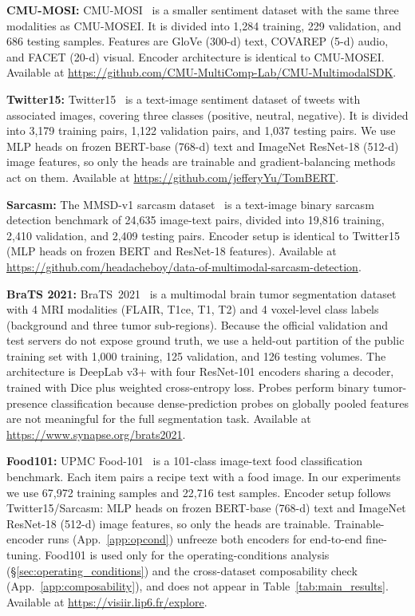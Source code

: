 \documentclass{article}
\begin{document}
\noindent\textbf{CMU-MOSI:} CMU-MOSI~\citep{zadeh2016mosi} is a smaller sentiment dataset with the same three modalities as CMU-MOSEI. It is divided into 1{,}284 training, 229 validation, and 686 testing samples. Features are GloVe (300-d) text, COVAREP (5-d) audio, and FACET (20-d) visual. Encoder architecture is identical to CMU-MOSEI. Available at \url{https://github.com/CMU-MultiComp-Lab/CMU-MultimodalSDK}.

\noindent\textbf{Twitter15:} Twitter15~\citep{yu2019tombert, zhang2018adaptive} is a text-image sentiment dataset of tweets with associated images, covering three classes (positive, neutral, negative). It is divided into 3{,}179 training pairs, 1{,}122 validation pairs, and 1{,}037 testing pairs. We use MLP heads on frozen BERT-base (768-d) text and ImageNet ResNet-18 (512-d) image features, so only the heads are trainable and gradient-balancing methods act on them. Available at \url{https://github.com/jefferyYu/TomBERT}.

\noindent\textbf{Sarcasm:} The MMSD-v1 sarcasm dataset~\citep{cai2019sarcasm} is a text-image binary sarcasm detection benchmark of 24{,}635 image-text pairs, divided into 19{,}816 training, 2{,}410 validation, and 2{,}409 testing pairs. Encoder setup is identical to Twitter15 (MLP heads on frozen BERT and ResNet-18 features). Available at \url{https://github.com/headacheboy/data-of-multimodal-sarcasm-detection}.

\noindent\textbf{BraTS 2021:} BraTS~2021~\citep{baid2021brats} is a multimodal brain tumor segmentation dataset with 4 MRI modalities (FLAIR, T1ce, T1, T2) and 4 voxel-level class labels (background and three tumor sub-regions). Because the official validation and test servers do not expose ground truth, we use a held-out partition of the public training set with 1{,}000 training, 125 validation, and 126 testing volumes. The architecture is DeepLab v3+ with four ResNet-101 encoders sharing a decoder, trained with Dice plus weighted cross-entropy loss. Probes perform binary tumor-presence classification because dense-prediction probes on globally pooled features are not meaningful for the full segmentation task. Available at \url{https://www.synapse.org/brats2021}.

\noindent\textbf{Food101:} UPMC Food-101~\citep{wang2015upmcfood} is a 101-class image-text food classification benchmark. Each item pairs a recipe text with a food image. In our experiments we use 67{,}972 training samples and 22{,}716 test samples. Encoder setup follows Twitter15/Sarcasm: MLP heads on frozen BERT-base (768-d) text and ImageNet ResNet-18 (512-d) image features, so only the heads are trainable. Trainable-encoder runs (App.~\ref{app:opcond}) unfreeze both encoders for end-to-end fine-tuning. Food101 is used only for the operating-conditions analysis (\S\ref{sec:operating_conditions}) and the cross-dataset composability check (App.~\ref{app:composability}), and does not appear in Table~\ref{tab:main_results}. Available at \url{https://visiir.lip6.fr/explore}.
\end{document}
